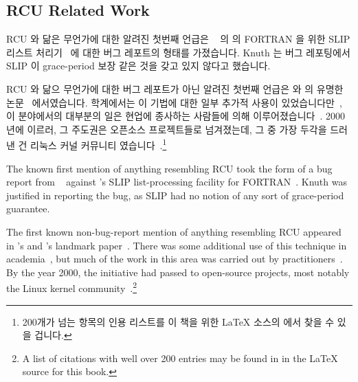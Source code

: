 
\subsection{RCU Related Work}
\label{sec:defer:RCU Related Work}

RCU 와 닮은 무언가에 대한 알려진 첫번째 언급은
~\cite[page 413 of Fundamental Algorithms]{Knuth73}
의  의 FORTRAN 을 위한 SLIP 리스트
처리기~\cite{Weizenbaum:1963:SLP:367593.367617} 에 대한 버그 레포트의 형태를
가졌습니다.
Knuth 는 버그 레포팅에서 SLIP 이 grace-period 보장 같은 것을 갖고 있지 않다고
했습니다.

RCU 와 닮으 무언가에 대한 버그 레포트가 아닌 알려진 첫번째 언급은
 와  의 유명한
논문~\cite{Kung80} 에서였습니다.
학계에서는 이 기법에 대한 일부 추가적 사용이
있었습니다만~\cite{Manber82,Manber84,BarbaraLiskov1988ArgusCACM,Pugh90,Andrews91textbook,Pu95a,Cowan96a,Rastogi:1997:LPV:645923.671017,Gamsa99},
이 분야에서의 대부분의 일은 현업에 종사하는 사람들에 의해
이루어졌습니다~\cite{RichardRashid87a,Hennessy89,Jacobson93,AjuJohn95,Slingwine95,Slingwine97,Slingwine98,McKenney98}.
2000 년에 이르러, 그 주도권은 오픈소스 프로젝트들로 넘겨졌는데, 그 중 가장
두각을 드러낸 건 리눅스 커널 커뮤니티
였습니다~\cite{RustyRussell2000a,RustyRussell2000b,McKenney01b,McKenney01a,McKenney02a,Arcangeli03}.\footnote{
	200개가 넘는 항목의 인용 리스트를 이 책을 위한 {\LaTeX} 소스의
	 에서 찾을 수 있을 겁니다.}

\iffalse

The known first mention of anything resembling RCU took the form of a bug
report from
~\cite[page 413 of Fundamental Algorithms]{Knuth73}
against 's SLIP list-processing facility for
FORTRAN~\cite{Weizenbaum:1963:SLP:367593.367617}.
Knuth was justified in reporting the bug, as SLIP had no notion of
any sort of grace-period guarantee.

The first known non-bug-report mention of anything resembling RCU appeared
in 's and 's landmark
paper~\cite{Kung80}.
There was some additional use of this technique in
academia~\cite{Manber82,Manber84,BarbaraLiskov1988ArgusCACM,Pugh90,Andrews91textbook,Pu95a,Cowan96a,Rastogi:1997:LPV:645923.671017,Gamsa99},
but much of the work in this area was carried out by
practitioners~\cite{RichardRashid87a,Hennessy89,Jacobson93,AjuJohn95,Slingwine95,Slingwine97,Slingwine98,McKenney98}.
By the year 2000, the initiative had passed to open-source projects,
most notably the Linux kernel
community~\cite{RustyRussell2000a,RustyRussell2000b,McKenney01b,McKenney01a,McKenney02a,Arcangeli03}.\footnote{
	A list of citations with well over 200 entries may be found in
	 in the {\LaTeX} source for this book.}


